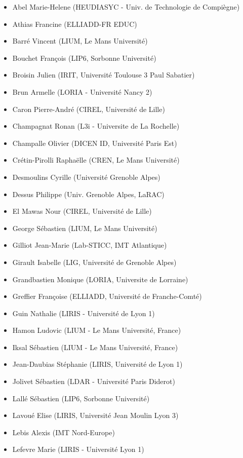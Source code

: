 \begin{itemize}
	\item[] Abel Marie-Helene (HEUDIASYC - Univ. de Technologie de Compiègne)
	\item[] Athias Francine (ELLIADD-FR EDUC)
	\item[] Barré Vincent (LIUM, Le Mans Université)
	\item[] Bouchet François (LIP6, Sorbonne Université)
	\item[] Broisin Julien (IRIT, Université Toulouse 3 Paul Sabatier)
	\item[] Brun Armelle (LORIA - Université Nancy 2)
	\item[] Caron Pierre-André (CIREL, Université de Lille)
	\item[] Champagnat Ronan (L3i - Universite de La Rochelle)
	\item[] Champalle Olivier (DICEN ID, Université Paris Est)
	\item[] Crétin-Pirolli Raphaëlle (CREN, Le Mans Université)
	\item[] Desmoulins Cyrille (Université Grenoble Alpes)
	\item[] Dessus Philippe (Univ. Grenoble Alpes, LaRAC)
	\item[] El Mawas Nour (CIREL, Université de Lille)
	\item[] George Sébastien (LIUM, Le Mans Université)
	\item[] Gilliot Jean-Marie (Lab-STICC, IMT Atlantique)
	\item[] Girault Isabelle (LIG, Université de Grenoble Alpes)
	\item[] Grandbastien Monique (LORIA, Universite de Lorraine)
	\item[] Greffier Françoise (ELLIADD, Université de Franche-Comté)
	\item[] Guin Nathalie (LIRIS - Université de Lyon 1)
	\item[] Hamon Ludovic (LIUM - Le Mans Université, France)
	\item[] Iksal Sébastien (LIUM - Le Mans Université, France)
	\item[] Jean-Daubias Stéphanie (LIRIS, Université de Lyon 1)
	\item[] Jolivet Sébastien (LDAR - Université Paris Diderot)
	\item[] Lallé Sébastien (LIP6, Sorbonne Université)
	\item[] Lavoué Elise (LIRIS, Université Jean Moulin Lyon 3)
	\item[] Lebis Alexis (IMT Nord-Europe)
	\item[] Lefevre Marie (LIRIS - Université Lyon 1)

\end{itemize}
